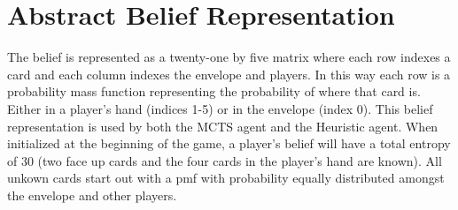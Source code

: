 \documentclass[msc, deptreport, ai, romanprepages]{infthesis}
\begin{document}
\chapter{Abstract Belief Representation}
The belief is represented as a twenty-one by five matrix where each row indexes a card and each column indexes the envelope and players. In this way each row is a probability mass function representing the probability of where that card is. Either in a player's hand (indices 1-5) or in the envelope (index 0). This belief representation is used by both the MCTS agent and the Heuristic agent. When initialized at the beginning of the game, a player's belief will have a total entropy of 30 (two face up cards and the four cards in the player's hand are known). All unkown cards start out with a pmf with probability equally distributed amongst the envelope and other players.

\newpage
\nocite{*}
 

\end{document}

